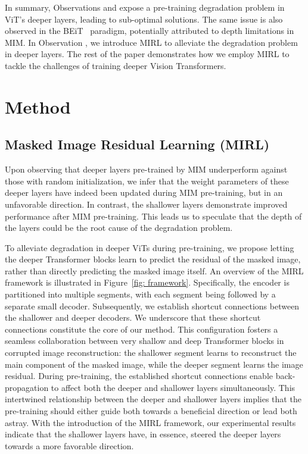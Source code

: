 \documentclass{article}
\begin{document}
In summary, Observations \uppercase\expandafter{} and \uppercase\expandafter{}  expose a pre-training degradation problem in ViT's deeper layers, leading to sub-optimal solutions. The same issue is also observed in the BEiT~\cite{bao2021beit} paradigm, potentially attributed to depth limitations in MIM. In Observation \uppercase\expandafter{}, we introduce MIRL to alleviate the degradation problem in deeper layers. The rest of the paper demonstrates how we employ MIRL to tackle the challenges of training deeper Vision Transformers.
 



\vspace{5pt}
\section{Method}
\label{sec: Method}
\vspace{5pt}
\subsection{Masked Image Residual Learning (MIRL)}


Upon observing that deeper layers pre-trained by MIM underperform against those with random initialization, we infer that the weight parameters of these deeper layers have indeed been updated during MIM pre-training, but in an unfavorable direction. In contrast, the shallower layers demonstrate improved performance after MIM pre-training. This leads us to speculate that the depth of the layers could be the root cause of the degradation problem.


To alleviate degradation in deeper ViTs during pre-training, we propose letting the deeper Transformer blocks learn to predict the residual of the masked image, rather than directly predicting the masked image itself.
An overview of the MIRL framework is illustrated in Figure~\ref{fig: framework}. Specifically, the encoder is partitioned into multiple segments, with each segment being followed by a separate small decoder. Subsequently, we establish shortcut connections between the shallower and deeper decoders.
We underscore that these shortcut connections constitute the core of our method. This configuration fosters a seamless collaboration between very shallow and deep Transformer blocks in corrupted image reconstruction: the shallower segment learns to reconstruct the main component of the masked image, while the deeper segment learns the image residual. During pre-training, the established shortcut connections enable back-propagation to affect both the deeper and shallower layers simultaneously. This intertwined relationship between the deeper and shallower layers implies that the pre-training should either guide both towards a beneficial direction or lead both astray. With the introduction of the MIRL framework, our experimental results indicate that the shallower layers have, in essence, steered the deeper layers towards a more favorable direction.
\end{document}
